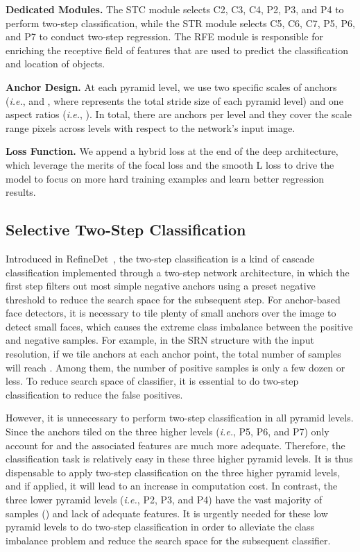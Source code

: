 \documentclass[letterpaper]{article} \usepackage{aaai19m}  \usepackage{times}  \usepackage{helvet}  \usepackage{courier}  \usepackage{url}  \usepackage{graphicx}  \usepackage{subfigure}
\def\ie{{\em i.e.}}
\begin{document}
{\flushleft \textbf{Dedicated Modules.} }
The STC module selects C2, C3, C4, P2, P3, and P4 to perform two-step classification, while the STR module selects C5, C6, C7, P5, P6, and P7 to conduct two-step regression. The RFE module is responsible for enriching the receptive field of features that are used to predict the classification and location of objects.

{\flushleft \textbf{Anchor Design.} }
At each pyramid level, we use two specific scales of anchors (\ie,  and , where  represents the total stride size of each pyramid level) and one aspect ratios (\ie, ). In total, there are  anchors per level and they cover the scale range  pixels across levels with respect to the network's input image.

{\flushleft \textbf{Loss Function.} }
We append a hybrid loss at the end of the deep architecture, which leverage the merits of the focal loss and the smooth L loss to drive the model to focus on more hard training examples and learn better regression results. 

\subsection{Selective Two-Step Classification}
Introduced in RefineDet~\cite{DBLP:journals/corr/abs-1711-06897}, the two-step classification is a kind of cascade classification implemented through a two-step network architecture, in which the first step filters out most simple negative anchors using a preset negative threshold  to reduce the search space for the subsequent step. For anchor-based face detectors, it is necessary to tile plenty of small anchors over the image to detect small faces, which causes the extreme class imbalance between the positive and negative samples. For example, in the SRN structure with the  input resolution, if we tile  anchors at each anchor point, the total number of samples will reach . Among them, the number of positive samples is only a few dozen or less. To reduce search space of classifier, it is essential to do two-step classification to reduce the false positives.

However, it is unnecessary to perform two-step classification in all pyramid levels. Since the anchors tiled on the three higher levels (\ie, P5, P6, and P7) only account for  and the associated features are much more adequate. Therefore, the classification task is relatively easy in these three higher pyramid levels. It is thus dispensable to apply two-step classification on the three higher pyramid levels, and if applied, it will lead to an increase in computation cost. In contrast, the three lower pyramid levels (\ie, P2, P3, and P4) have the vast majority of samples () and lack of adequate features. It is urgently needed for these low pyramid levels to do two-step classification in order to alleviate the class imbalance problem and reduce the search space for the subsequent classifier.
\end{document}
